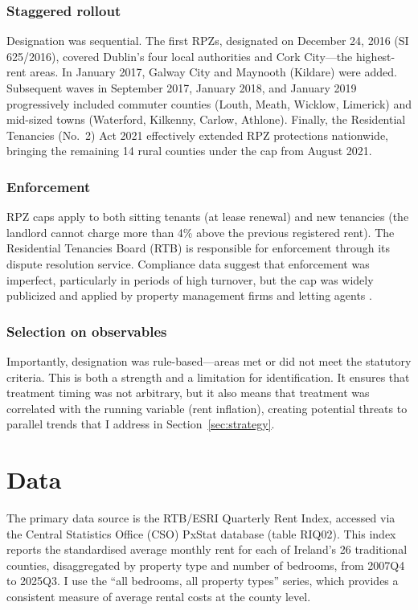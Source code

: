 \documentclass[12pt]{article}
\begin{document}
\subsubsection*{Staggered rollout} Designation was sequential. The first RPZs, designated on December 24, 2016 (SI 625/2016), covered Dublin's four local authorities and Cork City---the highest-rent areas. In January 2017, Galway City and Maynooth (Kildare) were added. Subsequent waves in September 2017, January 2018, and January 2019 progressively included commuter counties (Louth, Meath, Wicklow, Limerick) and mid-sized towns (Waterford, Kilkenny, Carlow, Athlone). Finally, the Residential Tenancies (No.\ 2) Act 2021 effectively extended RPZ protections nationwide, bringing the remaining 14 rural counties under the cap from August 2021.

\subsubsection*{Enforcement} RPZ caps apply to both sitting tenants (at lease renewal) and new tenancies (the landlord cannot charge more than 4\% above the previous registered rent). The Residential Tenancies Board (RTB) is responsible for enforcement through its dispute resolution service. Compliance data suggest that enforcement was imperfect, particularly in periods of high turnover, but the cap was widely publicized and applied by property management firms and letting agents \citep{rtb2020}.

\subsubsection*{Selection on observables} Importantly, designation was rule-based---areas met or did not meet the statutory criteria. This is both a strength and a limitation for identification. It ensures that treatment timing was not arbitrary, but it also means that treatment was correlated with the running variable (rent inflation), creating potential threats to parallel trends that I address in Section~\ref{sec:strategy}.


\section{Data}
\label{sec:data}

The primary data source is the RTB/ESRI Quarterly Rent Index, accessed via the Central Statistics Office (CSO) PxStat database (table RIQ02). This index reports the standardised average monthly rent for each of Ireland's 26 traditional counties, disaggregated by property type and number of bedrooms, from 2007Q4 to 2025Q3. I use the ``all bedrooms, all property types'' series, which provides a consistent measure of average rental costs at the county level.
\end{document}
